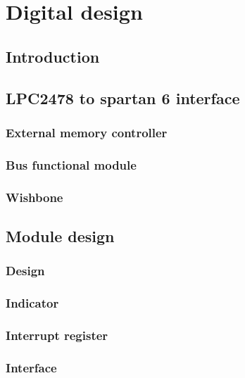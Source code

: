 \chapter{Digital design}
\section{Introduction}
%

\section{LPC2478 to spartan 6 interface}
%

\subsection{External memory controller}
\subsection{Bus functional module}
\subsection{Wishbone}
\section{Module design}
%

\subsection{Design}
\subsection{Indicator}
\subsection{Interrupt register}
\subsection{Interface}
